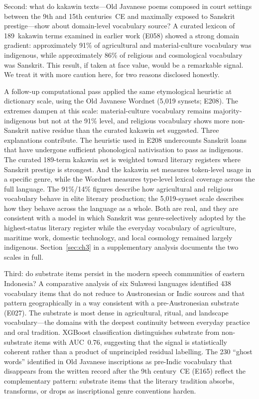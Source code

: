 \documentclass[12pt,a4paper]{article}
\begin{document}
Second: what do kakawin texts---Old Javanese poems composed in court settings between the 9th and 15th centuries~CE and maximally exposed to Sanskrit prestige---show about domain-level vocabulary source? A curated lexicon of 189~kakawin terms examined in earlier work (E058) showed a strong domain gradient: approximately 91\% of agricultural and material-culture vocabulary was indigenous, while approximately 86\% of religious and cosmological vocabulary was Sanskrit. This result, if taken at face value, would be a remarkable signal. We treat it with more caution here, for two reasons disclosed honestly.

A follow-up computational pass applied the same etymological heuristic at dictionary scale, using the Old Javanese Wordnet (5{,}019 synsets; E208). The extremes dampen at this scale: material-culture vocabulary remains majority-indigenous but not at the 91\% level, and religious vocabulary shows more non-Sanskrit native residue than the curated kakawin set suggested. Three explanations contribute. The heuristic used in E208 undercounts Sanskrit loans that have undergone sufficient phonological nativisation to pass as indigenous. The curated 189-term kakawin set is weighted toward literary registers where Sanskrit prestige is strongest. And the kakawin set measures token-level usage in a specific genre, while the Wordnet measures type-level lexical coverage across the full language. The 91\%/14\% figures describe how agricultural and religious vocabulary behave in elite literary production; the 5{,}019-synset scale describes how they behave across the language as a whole. Both are real, and they are consistent with a model in which Sanskrit was genre-selectively adopted by the highest-status literary register while the everyday vocabulary of agriculture, maritime work, domestic technology, and local cosmology remained largely indigenous. Section~\ref{sec:ch3} in a supplementary analysis documents the two scales in full.

Third: do substrate items persist in the modern speech communities of eastern Indonesia? A comparative analysis of six Sulawesi languages identified 438 vocabulary items that do not reduce to Austronesian or Indic sources and that pattern geographically in a way consistent with a pre-Austronesian substrate (E027). The substrate is most dense in agricultural, ritual, and landscape vocabulary---the domains with the deepest continuity between everyday practice and oral tradition. XGBoost classification distinguishes substrate from non-substrate items with AUC~0.76, suggesting that the signal is statistically coherent rather than a product of unprincipled residual labelling. The 230 ``ghost words'' identified in Old Javanese inscriptions as pre-Indic vocabulary that disappears from the written record after the 9th century~CE (E165) reflect the complementary pattern: substrate items that the literary tradition absorbs, transforms, or drops as inscriptional genre conventions harden.
\end{document}
